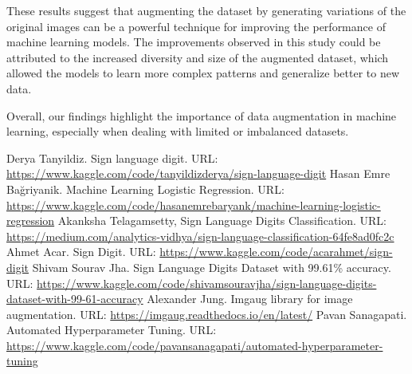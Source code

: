 \documentclass[conference]{IEEEtran}
\begin{document}
These results suggest that augmenting the dataset by generating variations of the original images can be a powerful technique for improving the performance of machine learning models. The improvements observed in this study could be attributed to the increased diversity and size of the augmented dataset, which allowed the models to learn more complex patterns and generalize better to new data.

Overall, our findings highlight the importance of data augmentation in machine learning, especially when dealing with limited or imbalanced datasets.

\begin{thebibliography}{00}
     Derya Tanyildiz. Sign language digit. URL: \url{https://www.kaggle.com/code/tanyildizderya/sign-language-digit}
     Hasan Emre Bağriyanik. Machine Learning Logistic Regression. URL: \url{https://www.kaggle.com/code/hasanemrebaryank/machine-learning-logistic-regression}
     Akanksha Telagamsetty, Sign Language Digits Classification. URL: \url{https://medium.com/analytics-vidhya/sign-language-classification-64fe8ad0fc2c}
     Ahmet Acar. Sign Digit. URL: \url{https://www.kaggle.com/code/acarahmet/sign-digit}
     Shivam Sourav Jha. Sign Language Digits Dataset with 99.61\% accuracy. URL: \url{https://www.kaggle.com/code/shivamsouravjha/sign-language-digits-dataset-with-99-61-accuracy}
     Alexander Jung. Imgaug library for image augmentation. URL: \url{https://imgaug.readthedocs.io/en/latest/}
     Pavan Sanagapati. Automated Hyperparameter Tuning. URL: \url{https://www.kaggle.com/code/pavansanagapati/automated-hyperparameter-tuning}
\end{thebibliography}
\end{document}
